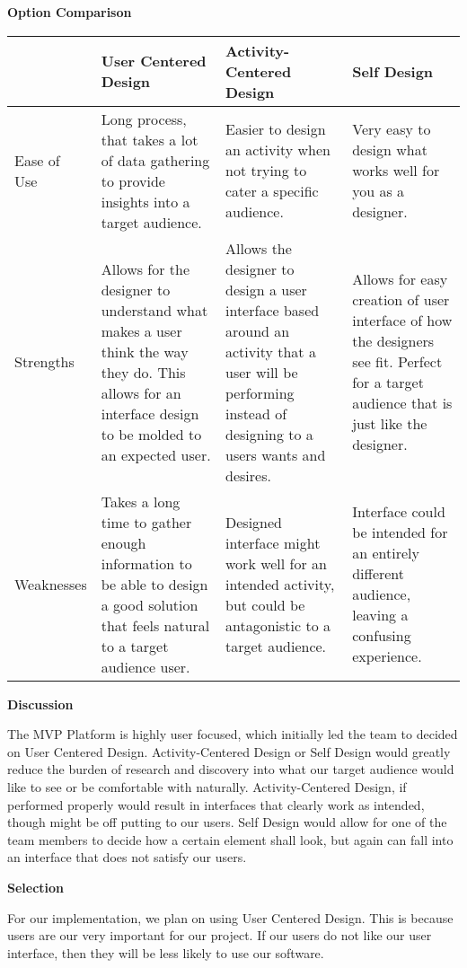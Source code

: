 \documentclass[letterpaper, 10pt, draftclsnofoot, compsoc, onecolumn]{IEEEtran}
\begin{document}
{\newpage
{\noindent\rmfamily\bfseries\color{black} Option Comparison \par}
\vspace{1pc}
\tablehead{}
\begin{supertabular}{|p{2cm}|p{4cm}|p{4cm}|p{4cm}|}
\hline  & User Centered Design & Activity-Centered Design & Self Design\\ \hline
Ease of Use 
	& Long process, that takes a lot of data gathering to provide insights into a target audience. 
	& Easier to design an activity when not trying to cater a specific audience. & Very easy to design what works well for you as a designer. \\ \hline
Strengths 
	& Allows for the designer to understand what makes a user think the way they do. This allows for an interface design to be molded to an expected user. & Allows the designer to design a user interface based around an activity that a user will be performing instead of designing to a users wants and desires. & Allows for easy creation of user interface of how the designers see fit. Perfect for a target audience that is just like the designer. \\ \hline
Weaknesses 
	& Takes a long time to gather enough information to be able to design a good solution that feels natural to a target audience user. 
	& Designed interface might work well for an intended activity, but could be antagonistic to a target audience. 
	& Interface could be intended for an entirely different audience, leaving a confusing experience.\\ \hline

\end{supertabular}

\newpage
{\noindent\rmfamily\bfseries\color{black} Discussion \par}
{\noindent The MVP Platform is highly user focused, which initially led the team to decided on User Centered Design. Activity-Centered Design or Self Design would greatly reduce the burden of research and discovery into what our target audience would like to see or be comfortable with naturally. Activity-Centered Design, if performed properly would result in interfaces that clearly work as intended, though might be off putting to our users. Self Design would allow for one of the team members to decide how a certain element shall look, but again can fall into an interface that does not satisfy our users.\par}

\medskip
{\noindent\rmfamily\bfseries\color{black} Selection \par}
{\noindent For our implementation, we plan on using User Centered Design. This is because users are our very important for our project. If our users do not like our user interface, then they will be less likely to use our software. \par}








}
\end{document}
